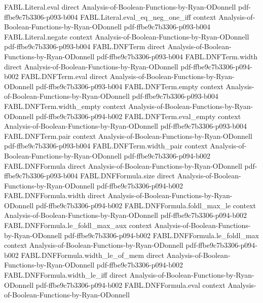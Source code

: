 \begin{theorem}
\proofstep
  {FABL.Literal.eval}
  {direct}
  {Analysis-of-Boolean-Functions-by-Ryan-ODonnell}
  {pdf-ffbe9c7b3306-p093-b004}
\proofstep
  {FABL.Literal.eval_eq_neg_one_iff}
  {context}
  {Analysis-of-Boolean-Functions-by-Ryan-ODonnell}
  {pdf-ffbe9c7b3306-p093-b004}
\proofstep
  {FABL.Literal.negate}
  {context}
  {Analysis-of-Boolean-Functions-by-Ryan-ODonnell}
  {pdf-ffbe9c7b3306-p093-b004}
\proofstep
  {FABL.DNFTerm}
  {direct}
  {Analysis-of-Boolean-Functions-by-Ryan-ODonnell}
  {pdf-ffbe9c7b3306-p093-b004}
\proofstep
  {FABL.DNFTerm.width}
  {direct}
  {Analysis-of-Boolean-Functions-by-Ryan-ODonnell}
  {pdf-ffbe9c7b3306-p094-b002}
\proofstep
  {FABL.DNFTerm.eval}
  {direct}
  {Analysis-of-Boolean-Functions-by-Ryan-ODonnell}
  {pdf-ffbe9c7b3306-p093-b004}
\proofstep
  {FABL.DNFTerm.empty}
  {context}
  {Analysis-of-Boolean-Functions-by-Ryan-ODonnell}
  {pdf-ffbe9c7b3306-p093-b004}
\proofstep
  {FABL.DNFTerm.width_empty}
  {context}
  {Analysis-of-Boolean-Functions-by-Ryan-ODonnell}
  {pdf-ffbe9c7b3306-p094-b002}
\proofstep
  {FABL.DNFTerm.eval_empty}
  {context}
  {Analysis-of-Boolean-Functions-by-Ryan-ODonnell}
  {pdf-ffbe9c7b3306-p093-b004}
\proofstep
  {FABL.DNFTerm.pair}
  {context}
  {Analysis-of-Boolean-Functions-by-Ryan-ODonnell}
  {pdf-ffbe9c7b3306-p093-b004}
\proofstep
  {FABL.DNFTerm.width_pair}
  {context}
  {Analysis-of-Boolean-Functions-by-Ryan-ODonnell}
  {pdf-ffbe9c7b3306-p094-b002}
\proofstep
  {FABL.DNFFormula}
  {direct}
  {Analysis-of-Boolean-Functions-by-Ryan-ODonnell}
  {pdf-ffbe9c7b3306-p093-b004}
\proofstep
  {FABL.DNFFormula.size}
  {direct}
  {Analysis-of-Boolean-Functions-by-Ryan-ODonnell}
  {pdf-ffbe9c7b3306-p094-b002}
\proofstep
  {FABL.DNFFormula.width}
  {direct}
  {Analysis-of-Boolean-Functions-by-Ryan-ODonnell}
  {pdf-ffbe9c7b3306-p094-b002}
\proofstep
  {FABL.DNFFormula.foldl_max_le}
  {context}
  {Analysis-of-Boolean-Functions-by-Ryan-ODonnell}
  {pdf-ffbe9c7b3306-p094-b002}
\proofstep
  {FABL.DNFFormula.le_foldl_max_aux}
  {context}
  {Analysis-of-Boolean-Functions-by-Ryan-ODonnell}
  {pdf-ffbe9c7b3306-p094-b002}
\proofstep
  {FABL.DNFFormula.le_foldl_max}
  {context}
  {Analysis-of-Boolean-Functions-by-Ryan-ODonnell}
  {pdf-ffbe9c7b3306-p094-b002}
\proofstep
  {FABL.DNFFormula.width_le_of_mem}
  {direct}
  {Analysis-of-Boolean-Functions-by-Ryan-ODonnell}
  {pdf-ffbe9c7b3306-p094-b002}
\proofstep
  {FABL.DNFFormula.width_le_iff}
  {direct}
  {Analysis-of-Boolean-Functions-by-Ryan-ODonnell}
  {pdf-ffbe9c7b3306-p094-b002}
\proofstep
  {FABL.DNFFormula.eval}
  {context}
  {Analysis-of-Boolean-Functions-by-Ryan-ODonnell}

\end{theorem}

